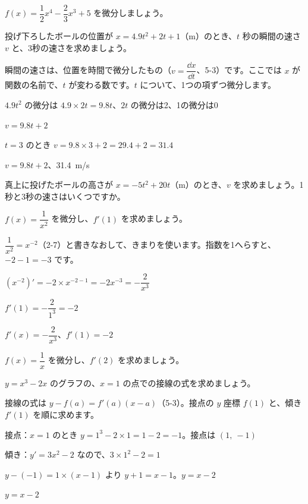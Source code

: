 \begin{jibun}
$f(x)=\dfrac{1}{2}x^4-\dfrac{2}{3}x^3+5$ を微分しましょう。
\end{jibun}

\begin{reidai}[位置から速さを求める]
投げ下ろしたボールの位置が $x=4.9t^2+2t+1$（m）のとき、$t$ 秒の瞬間の速さ $v$ と、3秒の速さを求めましょう。\par
\kangaekata 瞬間の速さは、位置を時間で微分したもの（$v=\dfrac{\dd x}{\dd t}$、5-3）です。ここでは $x$ が関数の名前で、$t$ が変わる数です。$t$ について、1つの項ずつ微分します。\par
\shiki $4.9t^2$ の微分は $4.9\times2t=9.8t$、$2t$ の微分は2、1の微分は0\par
\hspace*{2.6\zw}$v=9.8t+2$\par
\hspace*{2.6\zw}$t=3$ のとき $v=9.8\times3+2=29.4+2=31.4$\par
\kotae $v=9.8t+2$、\qty{31.4}{m/s}
\end{reidai}

\begin{jibun}
真上に投げたボールの高さが $x=-5t^2+20t$（m）のとき、$v$ を求めましょう。1秒と3秒の速さはいくつですか。
\end{jibun}

\begin{reidai}[マイナスの指数]
$f(x)=\dfrac{1}{x^2}$ を微分し、$f'(1)$ を求めましょう。\par
\kangaekata $\dfrac{1}{x^2}=x^{-2}$（2-7）と書きなおして、きまりを使います。指数を1へらすと、$-2-1=-3$ です。\par
\shiki $(x^{-2})'=-2\times x^{-2-1}=-2x^{-3}=-\dfrac{2}{x^3}$\par
\hspace*{2.6\zw}$f'(1)=-\dfrac{2}{1^3}=-2$\par
\kotae $f'(x)=-\dfrac{2}{x^3}$、$f'(1)=-2$
\end{reidai}

\begin{jibun}
$f(x)=\dfrac{1}{x}$ を微分し、$f'(2)$ を求めましょう。
\end{jibun}

\begin{reidai}[接線の式]
$y=x^3-2x$ のグラフの、$x=1$ の点での接線の式を求めましょう。\par
\kangaekata 接線の式は $y-f(a)=f'(a)(x-a)$（5-3）。接点の $y$ 座標 $f(1)$ と、傾き $f'(1)$ を順に求めます。\par
\shiki 接点：$x=1$ のとき $y=1^3-2\times1=1-2=-1$。接点は $(1,\ -1)$\par
\hspace*{2.6\zw}傾き：$y'=3x^2-2$ なので、$3\times1^2-2=1$\par
\hspace*{2.6\zw}$y-(-1)=1\times(x-1)$ より $y+1=x-1$。$y=x-2$\par
\kotae $y=x-2$
\end{reidai}


